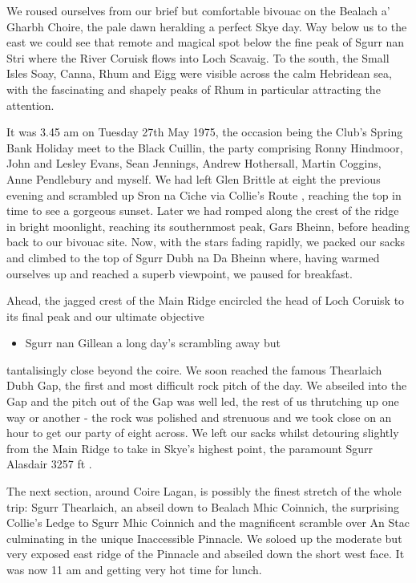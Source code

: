 \documentclass[a5paper,openany,font 10pt]{scrbook}
\begin{document}
We roused ourselves from our brief but comfortable bivouac
on the  Bealach a' Gharbh Choire, the pale dawn heralding a
perfect Skye day.  Way below us to the east we could see that
remote and magical spot  below the fine peak of Sgurr nan Stri
where the River Coruisk flows  into Loch Scavaig. To the south,
the Small Isles   Soay, Canna, Rhum and  Eigg   were visible
across the calm Hebridean sea, with the fascinating  and shapely
peaks of Rhum in particular attracting the attention.

It was 3.45 am on Tuesday 27th May 1975, the occasion being
the Club's  Spring Bank Holiday meet to the Black Cuillin, the
party  comprising Ronny Hindmoor, John and Lesley Evans, Sean
Jennings,  Andrew Hothersall, Martin Coggins, Anne Pendlebury and
myself. We had  left Glen Brittle at eight the previous evening
and scrambled  up Sron na Ciche via  Collie's Route , reaching the
top in time to see a  gorgeous sunset. Later we had romped along
the crest of the ridge in  bright moonlight, reaching its
southernmost peak, Gars Bheinn, before  heading back to our
bivouac site. Now, with the stars fading rapidly, we  packed our
sacks and climbed to the top of Sgurr Dubh na Da Bheinn  where,
having warmed ourselves up and reached a superb viewpoint, we
paused for breakfast.

Ahead, the jagged crest of the Main Ridge encircled  the
head of Loch Coruisk to its final peak and our ultimate objective
\begin{itemize}
\item Sgurr nan Gillean   a long day's scrambling away but
\end{itemize}
tantalisingly close beyond the coire. We soon reached the famous
Thearlaich Dubh Gap, the first and most  difficult rock pitch of
the day. We abseiled into the Gap and the pitch out of the Gap
was well led, the rest of us thrutching up one way or another -
the rock was  polished and strenuous and we took close on an hour
to get our party of  eight across. We left our sacks whilst
detouring slightly from the Main  Ridge to take in Skye's highest
point, the paramount Sgurr Alasdair  3257 ft .

The next section, around Coire Lagan, is possibly the
finest stretch of the whole trip: Sgurr Thearlaich, an abseil
down to  Bealach Mhic Coinnich, the surprising Collie's Ledge to
Sgurr Mhic  Coinnich and the magnificent scramble over An Stac
culminating in  the unique Inaccessible Pinnacle. We soloed up
the moderate but very  exposed east ridge of the Pinnacle and
abseiled down the short west face. It was now  11 am and getting
very hot  time for lunch.
\end{document}
